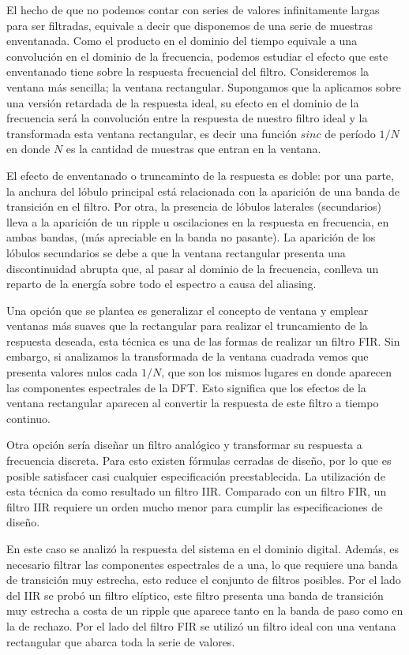 El hecho de que no podemos contar con series de valores infinitamente largas para ser filtradas, equivale a decir que disponemos de una serie de muestras enventanada.
Como el producto en el dominio del tiempo equivale a una convolución en el dominio de la frecuencia, podemos estudiar el efecto que este enventanado tiene sobre la respuesta frecuencial del filtro.
Consideremos la ventana más sencilla; la ventana rectangular. Supongamos que la aplicamos sobre una versión retardada de la respuesta ideal, su efecto en el dominio de la frecuencia será la convolución entre la respuesta de nuestro filtro ideal y la transformada esta ventana rectangular, es decir una función $sinc$ de período $1/N$ en donde $N$ es la cantidad de muestras que entran en la ventana.

El efecto de enventanado o truncaminto de la respuesta es doble: por una parte, la anchura del lóbulo principal está relacionada con la aparición de una banda de transición en el filtro. Por otra, la presencia de lóbulos laterales (secundarios) lleva a la aparición de un ripple u oscilaciones en la respuesta en frecuencia, en ambas bandas, (más apreciable en la banda no pasante).
La aparición de los lóbulos secundarios se debe a que la ventana rectangular presenta una discontinuidad abrupta que, al pasar al dominio de la frecuencia, conlleva un reparto de la energía sobre todo el espectro a causa del aliasing.

Una opción que se plantea es generalizar el concepto de ventana y emplear ventanas más suaves que la rectangular para realizar el truncamiento de la respuesta deseada, esta técnica es una de las formas de realizar un filtro FIR.
Sin embargo, si analizamos la transformada de la ventana cuadrada vemos que presenta valores nulos cada $1/N$, que son los mismos lugares en donde aparecen las componentes espectrales de la DFT. Esto significa que los efectos de la ventana rectangular aparecen al convertir la respuesta de este filtro a tiempo continuo.

Otra opción sería diseñar un filtro analógico y transformar su respuesta a frecuencia discreta. Para esto existen fórmulas cerradas de diseño, por lo que es posible satisfacer casi cualquier especificación preestablecida. La utilización de esta técnica da como resultado un filtro IIR. Comparado con un filtro FIR, un filtro IIR requiere un orden mucho menor para cumplir las especificaciones de diseño.

En este caso se analizó la respuesta del sistema en el dominio digital.
Además, es necesario filtrar las componentes espectrales de a una, lo que requiere una banda de transición muy estrecha, esto reduce el conjunto de filtros posibles.
Por el lado del IIR se probó un filtro elíptico, este filtro presenta una banda de transición muy estrecha a costa de un ripple que aparece tanto en la banda de paso como en la de rechazo.
Por el lado del filtro FIR se utilizó un filtro ideal con una ventana rectangular que abarca toda la serie de valores.

